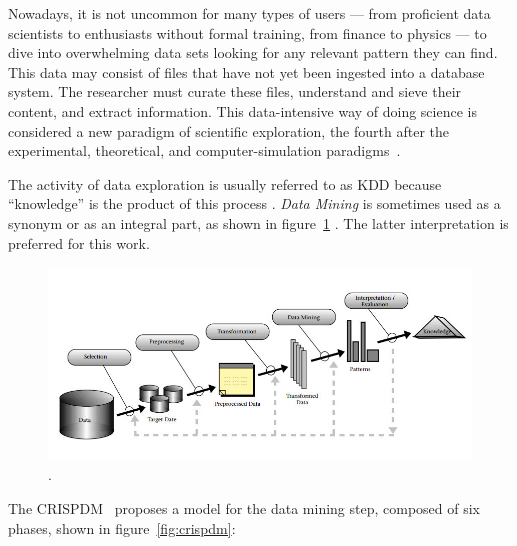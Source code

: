 
Nowadays, it is not uncommon for many types of users
--- from proficient data scientists to enthusiasts without formal
training, from finance to physics --- to dive into overwhelming
data sets looking for any relevant pattern they can find. This data
may consist of files that have not yet been ingested into a
database system. The researcher must curate
these files, understand and sieve their content, and 
extract information. This data-intensive way of doing science is considered
a new paradigm of scientific exploration, the fourth after the experimental, theoretical, and computer-simulation paradigms~\cite{bell2009beyond,hey2009the}.

The activity of data exploration is usually referred to as \gls{KDD}
because ``knowledge'' is the product of this process
\parencite{Piatetsky-Shapiro1991,Fayyad1996a}.
\emph{Data Mining} is sometimes used as a synonym or as an integral
part, as shown in figure~\ref{fig:kdd} \cite{Fayyad1996a,Reinartz1999}.
The latter interpretation is preferred for this work. 

\begin{figure}[htbp]
    \centering
    \includegraphics[width=\linewidth]{images/1_introduction/kdd.jpg}
    \caption{.}
    \label{fig:kdd}
\end{figure}

The \gls{CRISPDM}~\cite{Shearer2000} proposes a model for the data
mining step, composed of six phases, shown in figure~\ref{fig:crispdm}:

